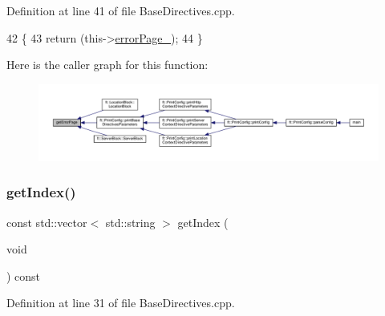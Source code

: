 Definition at line 41 of file Base\+Directives.\+cpp.


\begin{DoxyCode}
42     \{
43         \textcolor{keywordflow}{return} (this->\hyperlink{classft_1_1_base_directives_a5c0d388109f086503961de84fe3fce90}{errorPage\_});
44     \}
\end{DoxyCode}
Here is the caller graph for this function\+:
\nopagebreak
\begin{figure}[H]
\begin{center}
\leavevmode
\includegraphics[width=350pt]{classft_1_1_base_directives_a3cb0c21f17781de392d5ee09d7190caf_icgraph}
\end{center}
\end{figure}
\mbox{\label{classft_1_1_base_directives_a018f34a5ffd66e891494b5c0ee69177b}} 
\subsubsection{\texorpdfstring{get\+Index()}{getIndex()}}
{\footnotesize\ttfamily const std\+::vector$<$ std\+::string $>$ get\+Index (\begin{DoxyParamCaption}\item[{void}]{ }\end{DoxyParamCaption}) const\hspace{0.3cm}{\ttfamily [inherited]}}



Definition at line 31 of file Base\+Directives.\+cpp.



